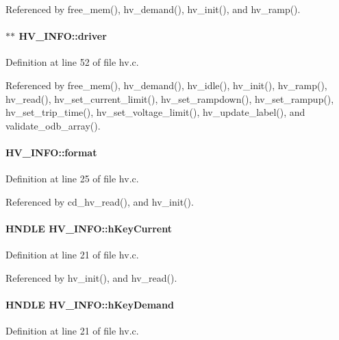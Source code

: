 Referenced by free\_\-mem(), hv\_\-demand(), hv\_\-init(), and hv\_\-ramp().
\paragraph[{driver}]{$\ast$$\ast$ {\bf HV\_\-INFO::driver}}\hfill\label{structHV__INFO_a06621eb6098d0cceb57de1a61a29e25c}


Definition at line 52 of file hv.c.

Referenced by free\_\-mem(), hv\_\-demand(), hv\_\-idle(), hv\_\-init(), hv\_\-ramp(), hv\_\-read(), hv\_\-set\_\-current\_\-limit(), hv\_\-set\_\-rampdown(), hv\_\-set\_\-rampup(), hv\_\-set\_\-trip\_\-time(), hv\_\-set\_\-voltage\_\-limit(), hv\_\-update\_\-label(), and validate\_\-odb\_\-array().
\paragraph[{format}]{ {\bf HV\_\-INFO::format}}\hfill\label{structHV__INFO_a04325175603b708132a47b04d699b1a8}


Definition at line 25 of file hv.c.

Referenced by cd\_\-hv\_\-read(), and hv\_\-init().
\paragraph[{hKeyCurrent}]{\setlength{\rightskip}{0pt plus 5cm}HNDLE {\bf HV\_\-INFO::hKeyCurrent}}\hfill\label{structHV__INFO_a46e402f65ea500e884faa91002204bf1}


Definition at line 21 of file hv.c.

Referenced by hv\_\-init(), and hv\_\-read().
\paragraph[{hKeyDemand}]{\setlength{\rightskip}{0pt plus 5cm}HNDLE {\bf HV\_\-INFO::hKeyDemand}}\hfill\label{structHV__INFO_a24238bcc73ad7722de5fc4106312d768}


Definition at line 21 of file hv.c.

